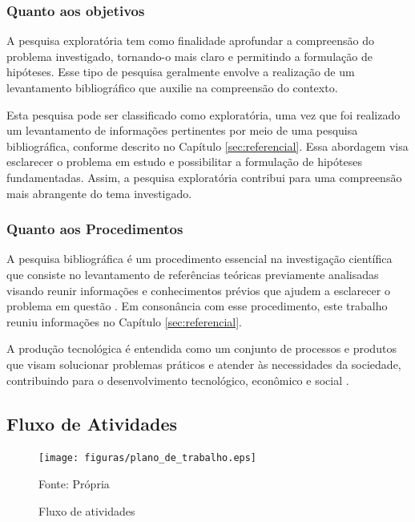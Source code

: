 \subsubsection{Quanto aos objetivos}

A pesquisa exploratória tem como finalidade aprofundar a compreensão do problema investigado, tornando-o mais claro e permitindo a formulação de hipóteses. Esse tipo de pesquisa geralmente envolve a realização de um levantamento bibliográfico que auxilie na compreensão do contexto.\cite{Gerhardt2009}

Esta pesquisa pode ser classificado como exploratória, uma vez que foi realizado um levantamento de informações pertinentes por meio de uma pesquisa bibliográfica, conforme descrito no Capítulo \ref{sec:referencial}. Essa abordagem visa esclarecer o problema em estudo e possibilitar a formulação de hipóteses fundamentadas. Assim, a pesquisa exploratória contribui para uma compreensão mais abrangente do tema investigado.



\subsubsection{Quanto aos Procedimentos}

A pesquisa bibliográfica é um procedimento essencial na investigação científica que consiste no levantamento de referências teóricas previamente analisadas visando reunir informações e conhecimentos prévios que ajudem a esclarecer o problema em questão \cite{Gerhardt2009}. Em consonância com esse procedimento, este trabalho reuniu informações no Capítulo \ref{sec:referencial}.

A produção tecnológica é entendida como um conjunto de processos e produtos que visam solucionar problemas práticos e atender às necessidades da sociedade, contribuindo para o desenvolvimento tecnológico, econômico e social \cite{Serzedello_Tomael_2011}.

\subsection{Fluxo de Atividades}
\label{sec:fluxo_de_atividades}

\begin{figure}[h!]
    \centering
    \texttt{[image: figuras/plano\_de\_trabalho.eps]}
    \caption{Fluxo de atividades}
    Fonte: Própria
    \label{fig:fluxo_atividade}
\end{figure}

